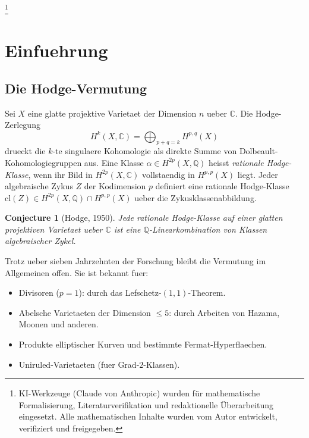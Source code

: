 \documentclass[aps,prd,twocolumn,superscriptaddress,nofootinbib]{revtex4-2}
\newtheorem{conjecture}[theorem]{Conjecture}
\theoremstyle{definition}
\theoremstyle{remark}
\begin{document}

\thanks{KI-Werkzeuge (Claude von Anthropic) wurden f\"ur mathematische Formalisierung, Literaturverifikation und redaktionelle \"Uberarbeitung eingesetzt. Alle mathematischen Inhalte wurden vom Autor entwickelt, verifiziert und freigegeben.}

\maketitle


\section{Einfuehrung}
\label{sec:intro}

\subsection{Die Hodge-Vermutung}

Sei $X$ eine glatte projektive Varietaet der Dimension $n$ ueber $\mathbb{C}$. Die Hodge-Zerlegung
\begin{equation}
H^k(X, \mathbb{C}) = \bigoplus_{p+q=k} H^{p,q}(X)
\label{eq:hodge_decomp}
\end{equation}
drueckt die $k$-te singulaere Kohomologie als direkte Summe von Dolbeault-Kohomologiegruppen aus. Eine Klasse $\alpha \in H^{2p}(X, \mathbb{Q})$ heisst \textit{rationale Hodge-Klasse}, wenn ihr Bild in $H^{2p}(X, \mathbb{C})$ vollstaendig in $H^{p,p}(X)$ liegt. Jeder algebraische Zykus $Z$ der Kodimension $p$ definiert eine rationale Hodge-Klasse $\mathrm{cl}(Z) \in H^{2p}(X, \mathbb{Q}) \cap H^{p,p}(X)$ ueber die Zykusklassenabbildung.

\begin{conjecture}[Hodge, 1950]
\label{conj:hodge}
Jede rationale Hodge-Klasse auf einer glatten projektiven Varietaet ueber $\mathbb{C}$ ist eine $\mathbb{Q}$-Linearkombination von Klassen algebraischer Zykel.
\end{conjecture}

Trotz ueber sieben Jahrzehnten der Forschung bleibt die Vermutung im Allgemeinen offen. Sie ist bekannt fuer:
\begin{itemize}
\item Divisoren ($p = 1$): durch das Lefschetz-$(1,1)$-Theorem.
\item Abelsche Varietaeten der Dimension $\leq 5$: durch Arbeiten von Hazama, Moonen und anderen.
\item Produkte elliptischer Kurven und bestimmte Fermat-Hyperflaechen.
\item Uniruled-Varietaeten (fuer Grad-$2$-Klassen).
\end{itemize}
\end{document}
